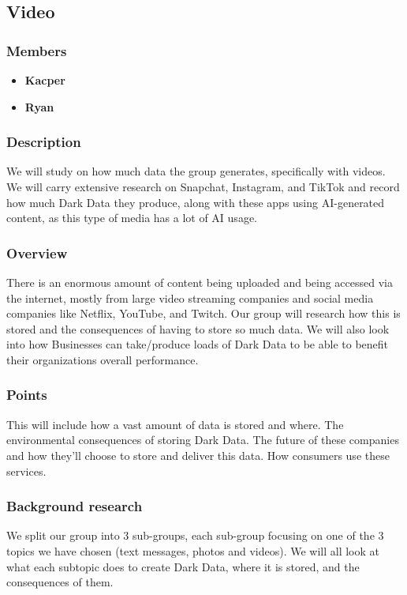 \documentclass{article}
\begin{document}
    \subsection{Video}
        \subsubsection{Members}
        \begin{itemize}
            \item \textbf{Kacper}
            \item \textbf{Ryan}
        \end{itemize}
        \subsubsection{Description}
        We will study on how much data the group generates, specifically with videos. We will carry extensive research on Snapchat, Instagram, and TikTok and record how much Dark Data they produce, along with these apps using AI-generated content, as this type of media has a lot of AI usage.

        \subsubsection{Overview}
        There is an enormous amount of content being uploaded and being accessed via the internet, mostly from large video 
        streaming companies and social media companies like Netflix, YouTube, and Twitch. Our group will research
        how this is stored and the consequences of having to store so much data. We will also look into how Businesses can
        take/produce loads of Dark Data to be able to benefit their organizations overall performance.

        \subsubsection{Points}
        This will include how a vast amount of data is stored and where. 
        The environmental consequences of storing Dark Data.
        The future of these companies and how they'll choose to store and deliver this data.
        How consumers use these services.

        \subsubsection{Background research}
        We split our group into 3 sub-groups, each sub-group focusing on one of the 3 topics we have chosen (text messages,
        photos and videos). We will all look at what each subtopic does to create Dark Data, where it is stored, and the
        consequences of them.
        
\end{document}
